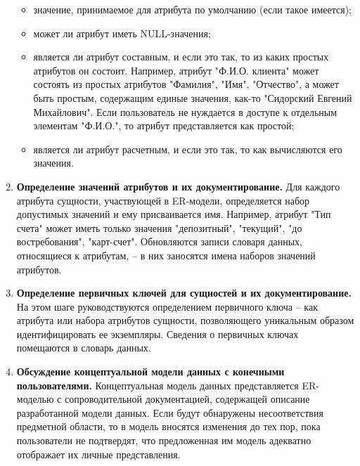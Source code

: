 \begin{enumerate}
\begin{itemize}
            \item значение, принимаемое для атрибута по умолчанию (если такое имеется);

            \item может ли атрибут иметь NULL-значения;

            \item является ли атрибут составным, и если это так, то из каких простых атрибутов он состоит.
                Например, атрибут "Ф.И.О. клиента" может состоять из простых атрибутов "Фамилия", "Имя",
                "Отчество", а может быть простым, содержащим единые значения, как-то "Сидорский Евгений
                Михайлович". Если пользователь не нуждается в доступе к отдельным элементам "Ф.И.О.",
                то атрибут представляется как простой;

            \item является ли атрибут расчетным, и если это так, то как вычисляются его значения.
        \end{itemize}

    \item \textbf{Определение значений атрибутов и их документирование.}
        Для каждого атрибута сущности, участвующей в ER-модели, определяется набор допустимых значений и ему
        присваивается имя. Например, атрибут "Тип счета" может иметь только значения "депозитный", "текущий",
        "до востребования", "карт-счет". Обновляются записи словаря данных, относящиеся к атрибутам, – в них
        заносятся имена наборов значений атрибутов.

    \item \textbf{Определение первичных ключей для сущностей и их документирование.}
        На этом шаге руководствуются определением первичного ключа – как атрибута или набора атрибутов сущности,
        позволяющего уникальным образом идентифицировать ее экземпляры. Сведения о первичных ключах помещаются
        в словарь данных.

    \item \textbf{Обсуждение концептуальной модели данных с конечными пользователями.}
        Концептуальная модель данных представляется ER-моделью с сопроводительной документацией, содержащей
        описание разработанной модели данных. Если будут обнаружены несоответствия предметной области, то в
        модель вносятся изменения  до тех пор, пока пользователи не подтвердят, что предложенная им модель
        адекватно отображает их личные представления.
\end{enumerate}

